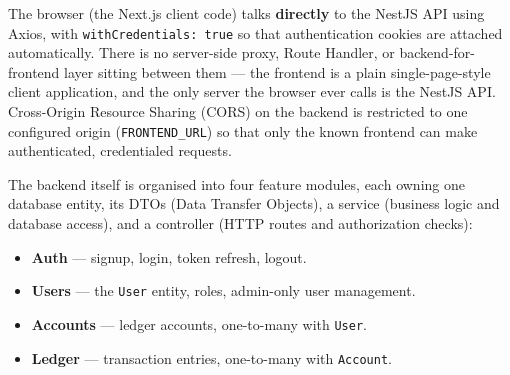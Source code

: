 \documentclass[11pt]{article}
\begin{document}
\begin{center}
\end{center}

The browser (the Next.js client code) talks \textbf{directly} to the
NestJS API using Axios, with \texttt{withCredentials: true} so that
authentication cookies are attached automatically. There is no
server-side proxy, Route Handler, or backend-for-frontend layer sitting
between them --- the frontend is a plain single-page-style client
application, and the only server the browser ever calls is the NestJS
API. Cross-Origin Resource Sharing (CORS) on the backend is restricted to
one configured origin (\texttt{FRONTEND\_URL}) so that only the known
frontend can make authenticated, credentialed requests.

The backend itself is organised into four feature modules, each owning
one database entity, its DTOs (Data Transfer Objects), a service (business
logic and database access), and a controller (HTTP routes and
authorization checks):

\begin{itemize}[nosep]
    \item \textbf{Auth} --- signup, login, token refresh, logout.
    \item \textbf{Users} --- the \texttt{User} entity, roles, admin-only
    user management.
    \item \textbf{Accounts} --- ledger accounts, one-to-many with
    \texttt{User}.
    \item \textbf{Ledger} --- transaction entries, one-to-many with
    \texttt{Account}.
\end{itemize}
\end{document}
